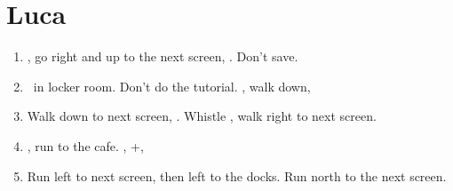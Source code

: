 \chapter{Luca}

\begin{enumerate}
	\item \sd, go right and up to the next screen, \cs[2:30]. Don't save.
	\item \sd\ in locker room. Don't do the tutorial. \sd, walk down, \sd
	\item Walk down to next screen, \sd. Whistle \cs[0:30], walk right to next screen.
	\item \sd, run to the cafe. \sd, \skippablefmv+\cs[1:20], \sd
	\item Run left to next screen, then left to the docks. Run north to the next screen.
\end{enumerate}

